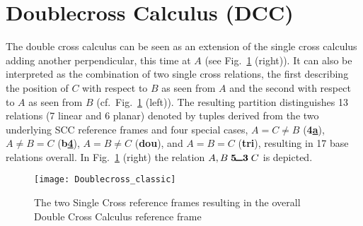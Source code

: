 
\section{Doublecross Calculus (DCC)}\label{sec:double-cross}


The double cross calculus \citep{cosyfre92} can be seen as an extension of the single cross calculus adding another perpendicular, this time at $A$ (see Fig.~\ref{fig:DCC} (right)). It can also be interpreted as the combination of two single cross relations, the first describing the position of $C$ with respect to $B$ as seen from $A$ and the second with respect to $A$ as seen from $B$ (cf.~Fig.~\ref{fig:DCC} (left)). The resulting partition distinguishes 13 relations (7 linear and 6 planar) denoted by tuples derived from the two underlying SCC reference frames and four special cases, $A=C \neq B$ (\textbf{4\ul a}), $A\neq B=C$ (\textbf{b\ul 4}), $A=B \neq C$ (\textbf{dou}), and $A=B=C$ (\textbf{tri}), resulting in 17 base relations overall. In Fig.~\ref{fig:DCC} (right) the relation $A,B\; \textbf{5\ul 3}\; C$ is depicted.

\begin{figure}[ht]
	\centering
	\texttt{[image: Doublecross\_classic]}
	\caption{The two Single Cross reference frames resulting in the overall Double Cross Calculus reference frame}
	\label{fig:DCC}
\end{figure}



